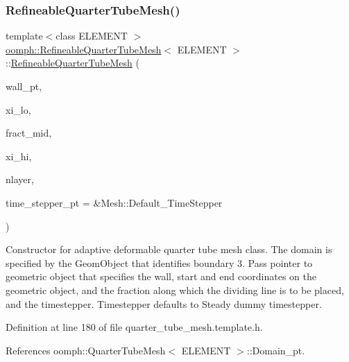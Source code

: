 \subsubsection{\texorpdfstring{Refineable\+Quarter\+Tube\+Mesh()}{RefineableQuarterTubeMesh()}}
{\footnotesize\ttfamily template$<$class E\+L\+E\+M\+E\+NT $>$ \\
\hyperlink{classoomph_1_1RefineableQuarterTubeMesh}{oomph\+::\+Refineable\+Quarter\+Tube\+Mesh}$<$ E\+L\+E\+M\+E\+NT $>$\+::\hyperlink{classoomph_1_1RefineableQuarterTubeMesh}{Refineable\+Quarter\+Tube\+Mesh} (\begin{DoxyParamCaption}\item[{Geom\+Object $\ast$}]{wall\+\_\+pt,  }\item[{const Vector$<$ double $>$ \&}]{xi\+\_\+lo,  }\item[{const double \&}]{fract\+\_\+mid,  }\item[{const Vector$<$ double $>$ \&}]{xi\+\_\+hi,  }\item[{const unsigned \&}]{nlayer,  }\item[{Time\+Stepper $\ast$}]{time\+\_\+stepper\+\_\+pt = {\ttfamily \&Mesh\+:\+:Default\+\_\+TimeStepper} }\end{DoxyParamCaption})\hspace{0.3cm}{\ttfamily [inline]}}



Constructor for adaptive deformable quarter tube mesh class. The domain is specified by the Geom\+Object that identifies boundary 3. Pass pointer to geometric object that specifies the wall, start and end coordinates on the geometric object, and the fraction along which the dividing line is to be placed, and the timestepper. Timestepper defaults to Steady dummy timestepper. 



Definition at line 180 of file quarter\+\_\+tube\+\_\+mesh.\+template.\+h.



References oomph\+::\+Quarter\+Tube\+Mesh$<$ E\+L\+E\+M\+E\+N\+T $>$\+::\+Domain\+\_\+pt.

\mbox{\label{classoomph_1_1RefineableQuarterTubeMesh_a229ad0335ba60176c578897b558790eb}} 
